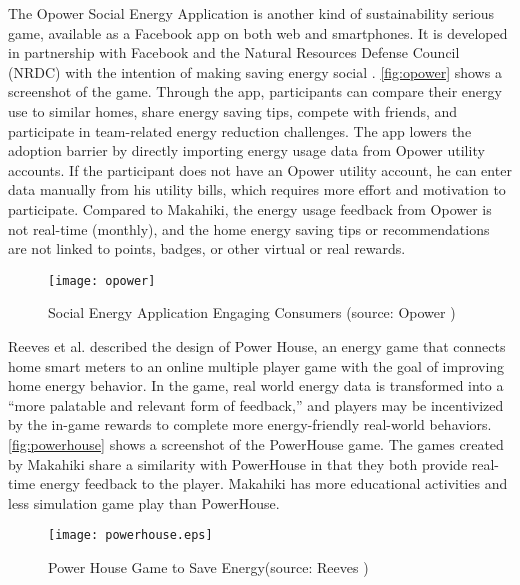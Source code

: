 The Opower Social Energy Application \cite{opower} is another kind of sustainability serious game, available as a Facebook app on both web and smartphones. It is developed in partnership with Facebook and the Natural Resources Defense Council (NRDC) with the intention of making saving energy social \cite{alliance}. \autoref{fig:opower} shows a screenshot of the game. Through the app, participants can compare their energy use to similar homes, share energy saving tips, compete with friends, and participate in team-related energy reduction challenges. The app lowers the adoption barrier by directly importing  energy usage data from Opower utility accounts. If the participant does not have an Opower utility account, he can enter data manually from his utility bills, which requires more effort and motivation to participate. Compared to Makahiki, the energy usage feedback from Opower is not real-time (monthly), and the home energy saving tips or recommendations are not linked to points, badges, or other virtual or real rewards.

\begin{figure}[ht!]
	\centering
		\texttt{[image: opower]}
		\caption{Social Energy Application Engaging Consumers (source: Opower \cite{opower})}
		\label{fig:opower}
\end{figure}

Reeves et al. \cite{Reeves2011powerhouse} described the design of Power House, an energy game that connects home smart meters to an online multiple player game with the goal of improving home energy behavior. In the game, real world energy data is transformed into a ``more palatable and relevant form of feedback,'' and players may be incentivized by the in-game rewards to complete more energy-friendly real-world behaviors. \autoref{fig:powerhouse} shows a screenshot of the PowerHouse game. The games created by Makahiki share a similarity with PowerHouse in that they both provide real-time energy feedback to the player. Makahiki has more educational activities and less simulation game play than PowerHouse.

\begin{figure}[ht!]
	\centering
		\texttt{[image: powerhouse.eps]}
		\caption{Power House Game to Save Energy(source: Reeves \cite{Reeves2011powerhouse})}
		\label{fig:powerhouse}
\end{figure}

